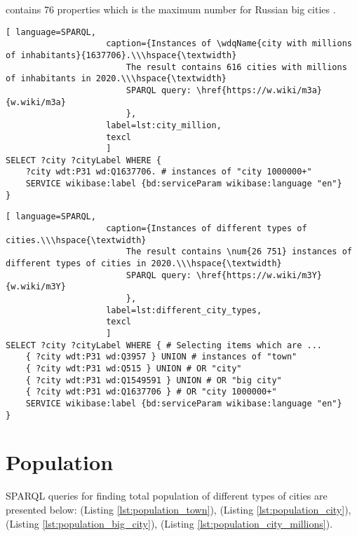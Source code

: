  contains 76 properties which is the maximum number for Russian big cities .


\begin{lstlisting}[ language=SPARQL, 
                    caption={Instances of \wdqName{city with millions of inhabitants}{1637706}.\\\hspace{\textwidth}
                        The result contains 616 cities with millions of inhabitants in 2020.\\\hspace{\textwidth}
                        SPARQL query: \href{https://w.wiki/m3a}{w.wiki/m3a}
                        },
                    label=lst:city_million,
                    texcl 
                    ]
SELECT ?city ?cityLabel WHERE {
	?city wdt:P31 wd:Q1637706. # instances of "city 1000000+" 
	SERVICE wikibase:label {bd:serviceParam wikibase:language "en"}
}
\end{lstlisting}%

\begin{lstlisting}[ language=SPARQL, 
                    caption={Instances of different types of cities.\\\hspace{\textwidth}
                        The result contains \num{26 751} instances of different types of cities in 2020.\\\hspace{\textwidth}
                        SPARQL query: \href{https://w.wiki/m3Y}{w.wiki/m3Y}
                        },
                    label=lst:different_city_types,
                    texcl 
                    ]
SELECT ?city ?cityLabel WHERE { # Selecting items which are ...
	{ ?city wdt:P31 wd:Q3957 } UNION # instances of "town"
	{ ?city wdt:P31 wd:Q515 } UNION # OR "city"
	{ ?city wdt:P31 wd:Q1549591 } UNION # OR "big city"
	{ ?city wdt:P31 wd:Q1637706 } # OR "city 1000000+"                                
	SERVICE wikibase:label {bd:serviceParam wikibase:language "en"}
}
\end{lstlisting}%

\section{Population}

SPARQL queries for finding total population of different types of cities are presented below:  (Listing \ref{lst:population_town}),  (Listing \ref{lst:population_city}),  (Listing \ref{lst:population_big_city}),  (Listing \ref{lst:population_city_millions}).

